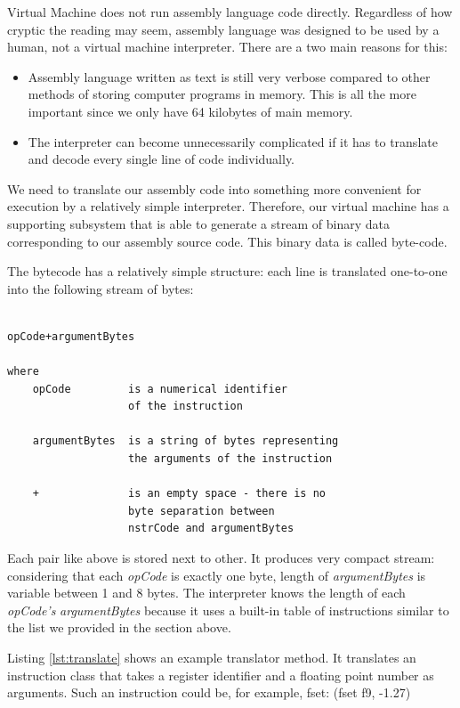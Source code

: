 \documentclass[oneside]{book}
\begin{document}
Virtual Machine does not run assembly language code directly. Regardless of how cryptic the reading may seem, assembly language was designed to be used by a human, not a virtual machine interpreter. 
There are a two main reasons for this: 

\begin{itemize}

\item Assembly language written as text is still very verbose compared to other methods of storing computer programs in memory. This is all the more important since we only have 64 kilobytes of main memory.

\item The interpreter can become unnecessarily complicated if it has to translate and decode every single line of code individually. 

\end{itemize}

We need to translate our assembly code into something more convenient for execution by a relatively simple interpreter. Therefore, our virtual machine has a supporting subsystem that is able to generate a stream of binary data corresponding to our assembly source code. This binary data is called byte-code.

The bytecode has a relatively simple structure: each line is translated one-to-one into the following stream of bytes:

\begin{lstlisting}

opCode+argumentBytes

where
	opCode         is a numerical identifier 
	               of the instruction
	               
	argumentBytes  is a string of bytes representing
	               the arguments of the instruction
	               
	+              is an empty space - there is no
	               byte separation between 
	               nstrCode and argumentBytes
\end{lstlisting}

Each pair like above is stored next to other. It produces very compact stream: considering that each \emph{opCode} is exactly one byte, length of \emph{argumentBytes} is variable between 1 and 8 bytes. The interpreter knows the length of each \emph{opCode's} \emph{argumentBytes} because it uses a built-in table of instructions similar to the list we provided in the section above.

Listing \ref{lst:translate} shows an example translator method. It translates an instruction class that takes a register identifier and a floating point number as arguments. Such an instruction could be, for example, fset: (fset f9, -1.27)
\end{document}

